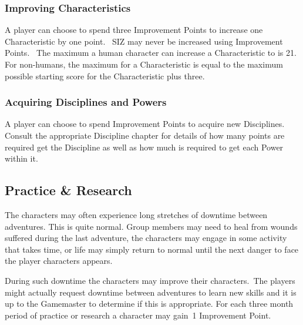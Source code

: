 \subsubsection{Improving Characteristics}
A player can choose to spend three Improvement Points to increase one Characteristic by one point. 
SIZ may never be increased using Improvement Points. 
The maximum a human character can increase a Characteristic to is 21. For non-humans, the maximum for a Characteristic is equal to the maximum possible starting score for the Characteristic plus three.

\subsubsection{Acquiring Disciplines and Powers}
A player can choose to spend Improvement Points to acquire new Disciplines. Consult the appropriate Discipline chapter for details of how many points are required get the Discipline as well as how much is required to get each Power within it.

\subsection{Practice \& Research}
The characters may often experience long stretches of downtime between adventures. This is quite normal. Group members may need to heal from wounds suffered during the last adventure, the characters may engage in some activity that takes time, or life may simply return to normal until the next danger to face the player characters appears.

During such downtime the characters may improve their characters. The players might actually request downtime between adventures to learn new skills and it is up to the Gamemaster to determine if this is appropriate.  
For each three month period of practice or research a character may gain 1 Improvement Point. 


